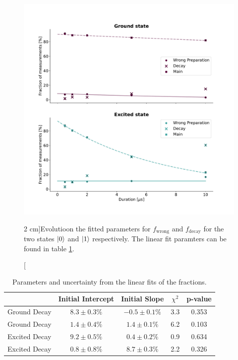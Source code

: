 \begin{figure}
    \centering
    \includegraphics{Figs/Results/IQ_plane_initial/fraction_evolution.pdf}
    \caption[][2 cm]{Evolutioon the fitted parameters for $f_{\text{wrong}}$ and $f_{\text{decay}}$ for the two states $\ket{0}$ and $\ket{1}$ respectively. The linear fit paramters can be found in table \ref{tab:experimental_fit_parameters_IQ_plane}.}
    \label{fig:evolution_of_fractions_in_fit}
\end{figure}


\begin{table}
\centering
\begin{tabular}{l|c|c|c|c}
 & Initial Intercept & Initial Slope & $\chi^2$ & p-value \\
\hline
Ground Decay & $8.3 \pm 0.3 \%$ & $-0.5 \pm 0.1 \%$ & 3.3 & 0.353 \\
Ground Decay & $1.4 \pm 0.4 \%$ & $1.4 \pm 0.1 \%$ & 6.2 & 0.103 \\
Excited Decay & $9.2 \pm 0.5 \%$ & $0.4 \pm 0.2 \%$ & 0.9 & 0.634 \\
Excited Decay & $0.8 \pm 0.8 \%$ & $8.7 \pm 0.3 \%$ & 2.2 & 0.326 \\
\end{tabular}
\caption{Parameters and uncertainty from the linear fits of the fractions. }
\label{tab:experimental_fit_parameters_IQ_plane}
\end{table}


